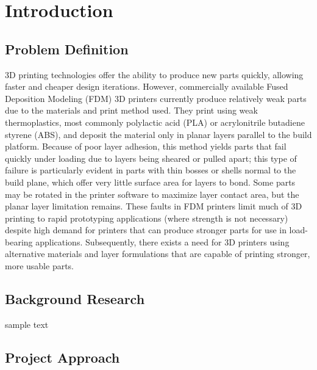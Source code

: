 \section{Introduction}

\subsection{Problem Definition}

\indent

3D printing technologies offer the ability to produce new parts quickly, allowing faster and cheaper design iterations. However, commercially available Fused Deposition Modeling (FDM) 3D printers currently produce relatively weak parts due to the materials and print method used. They print using weak thermoplastics, most commonly polylactic acid (PLA) or acrylonitrile butadiene styrene (ABS), and deposit the material only in planar layers parallel to the build platform. Because of poor layer adhesion, this method yields parts that fail quickly under loading due to layers being sheared or pulled apart; this type of failure is particularly evident in parts with thin bosses or shells normal to the build plane, which offer very little surface area for layers to bond. Some parts may be rotated in the printer software to maximize layer contact area, but the planar layer limitation remains. These faults in FDM printers limit much of 3D printing to rapid prototyping applications (where strength is not necessary) despite high demand for printers that can produce stronger parts for use in load-bearing applications. Subsequently, there exists a need for 3D printers using alternative materials and layer formulations that are capable of printing stronger, more usable parts.\\

\subsection{Background Research}

\indent


sample text

\subsection{Project Approach}

